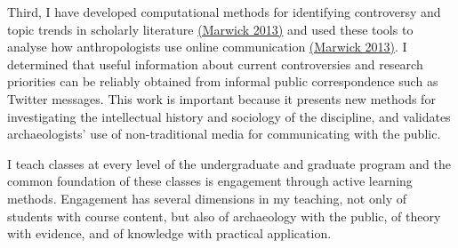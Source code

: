 \documentclass[11pt,article,oneside]{memoir}
\begin{document}
Third, I have developed computational methods for identifying controversy and topic trends in scholarly literature \href{https://github.com/benmarwick/JSTORr}{(Marwick 2013)} and used these tools to analyse how anthropologists use online communication \href{http://faculty.washington.edu/bmarwick/PDFs/Marwick_2013_DMAR.pdf}{(Marwick 2013)}. I determined that useful information about current controversies and research priorities can be reliably obtained from informal public correspondence such as Twitter messages. This work is important because it presents new methods for investigating the intellectual history and sociology of the discipline, and validates archaeologists' use of non-traditional media for communicating with the public. 

\bigskip     


I teach classes at every level of the undergraduate and graduate program and the common foundation of these classes is engagement through active learning methods. Engagement has several dimensions in my teaching, not only of students with course content, but also of archaeology with the public, of theory with evidence, and of knowledge with practical application. 
\end{document}
